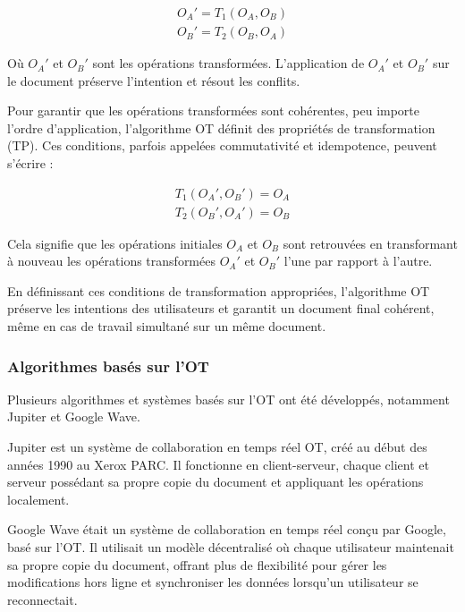 \begin{equation}
    \begin{aligned}
        O_A' = T_1(O_A, O_B) \\
        O_B' = T_2(O_B, O_A)
    \end{aligned}
\end{equation}

Où $O_A'$ et $O_B'$ sont les opérations transformées. L'application de $O_A'$ et $O_B'$ sur le document préserve l'intention et résout les conflits.

Pour garantir que les opérations transformées sont cohérentes, peu importe l'ordre d'application, l'algorithme OT définit des propriétés de transformation (TP). Ces conditions, parfois appelées commutativité et idempotence, peuvent s'écrire :

\begin{equation}
    \begin{aligned}
        T_1(O_A', O_B') = O_A \\
        T_2(O_B', O_A') = O_B
    \end{aligned}
\end{equation}

Cela signifie que les opérations initiales $O_A$ et $O_B$ sont retrouvées en transformant à nouveau les opérations transformées $O_A'$ et $O_B'$ l'une par rapport à l'autre.

En définissant ces conditions de transformation appropriées, l'algorithme OT préserve les intentions des utilisateurs et garantit un document final cohérent, même en cas de travail simultané sur un même document.

\subsubsection{Algorithmes basés sur l'OT}
Plusieurs algorithmes et systèmes basés sur l'OT ont été développés, notamment Jupiter et Google Wave.

Jupiter est un système de collaboration en temps réel OT, créé au début des années 1990 au Xerox PARC. Il fonctionne en client-serveur, chaque client et serveur possédant sa propre copie du document et appliquant les opérations localement.

Google Wave était un système de collaboration en temps réel conçu par Google, basé sur l'OT. Il utilisait un modèle décentralisé où chaque utilisateur maintenait sa propre copie du document, offrant plus de flexibilité pour gérer les modifications hors ligne et synchroniser les données lorsqu'un utilisateur se reconnectait.

